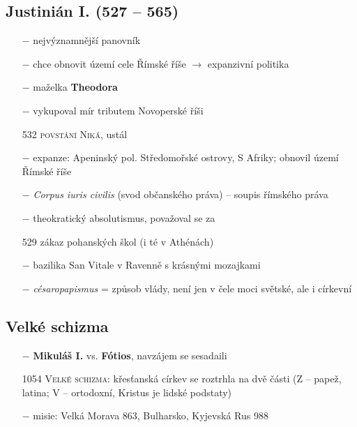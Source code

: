 \documentclass{article}
\begin{document}
\subsection*{Justinián I. (527 -- 565)}
\begin{itemize}
    \vspace{-0.5em}
    \setlength\itemsep{0.15em}
    \item[$-$] nejvýznamnější panovník
    \item[$-$] chce obnovit území cele Římské říše $\rightarrow$ expanzivní politika
    \item[$-$] maželka \textbf{Theodora}
    \item[$-$] vykupoval mír tributem Novoperské říši
    \item[532] \textsc{povstání Niká}, ustál
    \item[$-$] expanze: Apeninský pol. Středomořské ostrovy, S Afriky; obnovil území Římské říše
    \item[$-$] \textit{Corpus iuris civilis} (svod občanského práva) -- soupis římského práva
    \item[$-$] theokratický absolutismus, považoval se za 
    \item[529] zákaz pohanských škol (i té v Athénách)
    \item[$-$] bazilika San Vitale v Ravenně s krásnými mozajkami
    \item[$-$] \textit{césaropapismus} = způsob vlády, není jen v čele moci světské, ale i církevní
\end{itemize}

\subsection*{Velké schizma}
\begin{itemize}
    \vspace{-0.5em}
    \setlength\itemsep{0.15em}
    \item[$-$] \textbf{Mikuláš I.} vs. \textbf{Fótios}, navzájem se sesadaili
    \item[1054] \textsc{Velké schizma}: křesťanská církev se roztrhla na dvě části (Z -- papež, latina; V -- ortodoxní, Kristus je lidské podstaty)
    \item[$-$] misie: Velká Morava 863, Bulharsko, Kyjevská Rus 988
\end{itemize}
\end{document}
